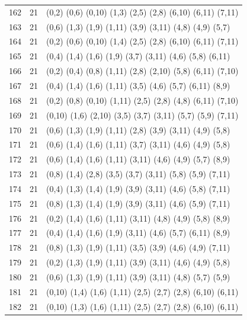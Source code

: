 \begin{appendix}
{\begin{longtable}{lll}
    162& 21 & (0,2)   (0,6)   (0,10)  (1,3)   (2,5)   (2,8)   (6,10)  (6,11)  (7,11)\\
    163& 21 & (0,6)   (1,3)   (1,9)   (1,11)  (3,9)   (3,11)  (4,8)   (4,9)   (5,7)\\
    164& 21 & (0,2)   (0,6)   (0,10)  (1,4)   (2,5)   (2,8)   (6,10)  (6,11)  (7,11)\\
    165& 21 & (0,4)   (1,4)   (1,6)   (1,9)   (3,7)   (3,11)  (4,6)   (5,8)   (6,11)\\
    166& 21 & (0,2)   (0,4)   (0,8)   (1,11)  (2,8)   (2,10)  (5,8)   (6,11)  (7,10)\\
    167& 21 & (0,4)   (1,4)   (1,6)   (1,11)  (3,5)   (4,6)   (5,7)   (6,11)  (8,9)\\
    168& 21 & (0,2)   (0,8)   (0,10)  (1,11)  (2,5)   (2,8)   (4,8)   (6,11)  (7,10)\\
    169& 21 & (0,10)  (1,6)   (2,10)  (3,5)   (3,7)   (3,11)  (5,7)   (5,9)   (7,11)\\
    170& 21 & (0,6)   (1,3)   (1,9)   (1,11)  (2,8)   (3,9)   (3,11)  (4,9)   (5,8)\\
    171& 21 & (0,6)   (1,4)   (1,6)   (1,11)  (3,7)   (3,11)  (4,6)   (4,9)   (5,8)\\
    172& 21 & (0,6)   (1,4)   (1,6)   (1,11)  (3,11)  (4,6)   (4,9)   (5,7)   (8,9)\\
    173& 21 & (0,8)   (1,4)   (2,8)   (3,5)   (3,7)   (3,11)  (5,8)   (5,9)   (7,11)\\
    174& 21 & (0,4)   (1,3)   (1,4)   (1,9)   (3,9)   (3,11)  (4,6)   (5,8)   (7,11)\\
    175& 21 & (0,8)   (1,3)   (1,4)   (1,9)   (3,9)   (3,11)  (4,6)   (5,9)   (7,11)\\
    176& 21 & (0,2)   (1,4)   (1,6)   (1,11)  (3,11)  (4,8)   (4,9)   (5,8)   (8,9)\\
    177& 21 & (0,4)   (1,4)   (1,6)   (1,9)   (3,11)  (4,6)   (5,7)   (6,11)  (8,9)\\
    178& 21 & (0,8)   (1,3)   (1,9)   (1,11)  (3,5)   (3,9)   (4,6)   (4,9)   (7,11)\\
    179& 21 & (0,2)   (1,3)   (1,9)   (1,11)  (3,9)   (3,11)  (4,6)   (4,9)   (5,8)\\
    180& 21 & (0,6)   (1,3)   (1,9)   (1,11)  (3,9)   (3,11)  (4,8)   (5,7)   (5,9)\\
    181& 21 & (0,10)  (1,4)   (1,6)   (1,11)  (2,5)   (2,7)   (2,8)   (6,10)  (6,11)\\
    182& 21 & (0,10)  (1,3)   (1,6)   (1,11)  (2,5)   (2,7)   (2,8)   (6,10)  (6,11)\\

\end{longtable}}
\end{appendix}
